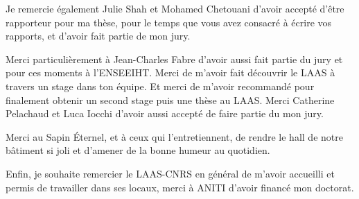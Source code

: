 
Je remercie également Julie Shah et Mohamed Chetouani d'avoir accepté d'être rapporteur pour ma thèse, pour le temps que vous avez consacré à écrire vos rapports, et d'avoir fait partie de mon jury. 

Merci particulièrement à Jean-Charles Fabre d'avoir aussi fait partie du jury et pour ces moments à l'ENSEEIHT. Merci de m'avoir fait découvrir le LAAS à travers un stage dans ton équipe. Et merci de m'avoir recommandé pour finalement obtenir un second stage puis une thèse au LAAS.
Merci Catherine Pelachaud et Luca Iocchi d'avoir aussi accepté de faire partie du mon jury. 



Merci au Sapin Éternel, et à ceux qui l'entretiennent, de rendre le hall de notre bâtiment si joli et d'amener de la bonne humeur au quotidien.



Enfin, je souhaite remercier le LAAS-CNRS en général de m'avoir accueilli et permis de travailler dans ses locaux, merci à ANITI d'avoir financé mon doctorat.
